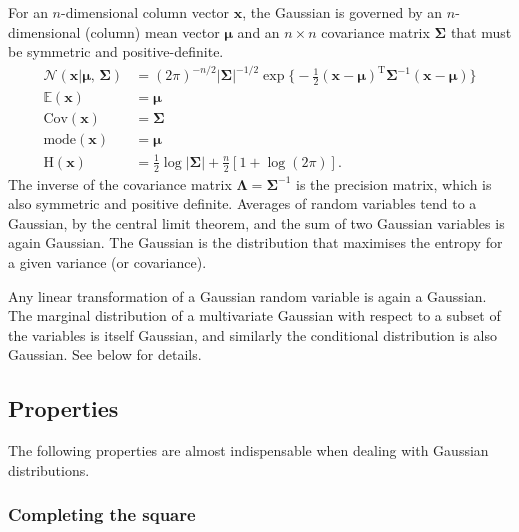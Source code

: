 For an $n$-dimensional column vector $\mathbf{x}$, the Gaussian is governed by an $n$-dimensional (column) mean vector $\boldsymbol{\mu}$ and an $n\times n$ covariance matrix $\boldsymbol{\Sigma}$ that must be symmetric and positive-definite.
\begin{align}
	\mathcal{N}(\mathbf{x}|\boldsymbol{\mu},\, \boldsymbol{\Sigma})
	&= (2\pi)^{-n/2}|\boldsymbol{\Sigma}|^{-1/2}\exp\Big\{-\frac{1}{2}(\mathbf{x} - \boldsymbol{\mu})^\text{T}\boldsymbol{\Sigma}^{-1}(\mathbf{x} - \boldsymbol{\mu})\Big\}
	\label{eq:gaussian-pdf-def} \\
	\mathbb{E}(\mathbf{x}) &= \boldsymbol{\mu}
	\\
	\mathrm{Cov}(\mathbf{x}) &= \boldsymbol{\Sigma}
	\\
	\mathrm{mode}(\mathbf{x}) &= \boldsymbol{\mu}
	\\
	\mathrm{H}(\mathbf{x})
	&= \frac{1}{2} \log|\boldsymbol{\Sigma}| + \frac{n}{2}[1 + \log(2\pi)].
	\label{eq:multivariate-gaussian-entropy}
\end{align}
The inverse of the covariance matrix $\boldsymbol{\Lambda} = \boldsymbol{\Sigma}^{-1}$ is the precision matrix, which is also symmetric and positive definite. Averages of random variables tend to a Gaussian, by the central limit theorem, and the sum of two Gaussian variables is again Gaussian. The Gaussian is the distribution that maximises the entropy for a given variance (or covariance).

Any linear transformation of a Gaussian random variable is again a Gaussian. The marginal distribution of a multivariate Gaussian with respect to a subset of the variables is itself Gaussian, and similarly the conditional distribution is also Gaussian. See below for details.

\subsection{Properties}
\label{sec:gaussian-identities}

The following properties \citep{rasmussen06, barber} are almost indispensable when dealing with Gaussian distributions.

\subsubsection{Completing the square}

